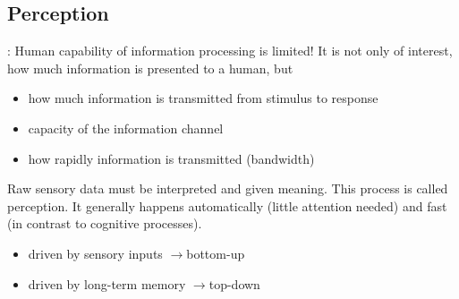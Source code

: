 \subsection{Perception}:
Human capability of information processing is limited! It is not only of interest, how much information is presented to a human, but
\begin{itemize}
\item how much information is transmitted from stimulus to response
\item capacity of the information channel
\item how rapidly information is transmitted (bandwidth)
\end{itemize}
Raw sensory data must be interpreted and given meaning. This process is called perception. It generally happens automatically (little attention needed) and fast (in contrast to cognitive processes).
\begin{itemize}
\item driven by sensory inputs $\rightarrow$bottom-up
\item driven by long-term memory $\rightarrow$top-down
\end{itemize}

